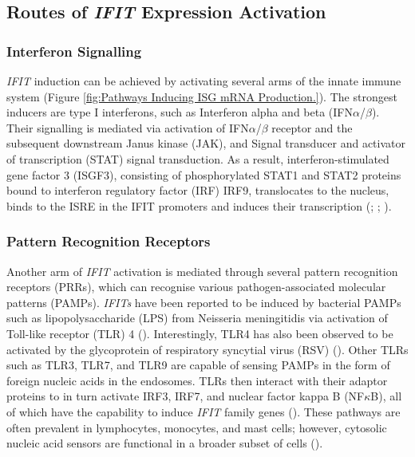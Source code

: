 \subsection{Routes of \textit{IFIT} Expression Activation} \label{subsec:Routes of IFIT Expression Activation}
\subsubsection{Interferon Signalling} \label{Interferon Signalling}
\textit{IFIT} induction can be achieved by activating several arms of the innate immune system (Figure \ref{fig:Pathways Inducing ISG mRNA Production.}). The strongest inducers are type I interferons, such as Interferon alpha and beta (IFN\(\alpha\)/\(\beta\)).  Their signalling is mediated via activation of IFN\(\alpha\)/\(\beta\) receptor and the subsequent downstream Janus kinase (JAK), and Signal transducer and activator of transcription (STAT) signal transduction. As a result, interferon-stimulated gene factor 3 (ISGF3), consisting of phosphorylated STAT1 and STAT2 proteins bound to interferon regulatory factor (IRF) IRF9, translocates to the nucleus, binds to the ISRE in the IFIT promoters and induces their transcription (\cite{Der1998IdentificationArrays}; \cite{Mesev2019DecodingInfection}; \cite{Schoggins2011Interferon-stimulatedFunctions}). 




\subsubsection{Pattern Recognition Receptors} \label{Pattern Recognition Receptors}
Another arm of \textit{IFIT} activation is mediated through several pattern recognition receptors (PRRs), which can recognise various pathogen-associated molecular patterns (PAMPs). \textit{IFITs} have been reported to be induced by bacterial PAMPs such as lipopolysaccharide (LPS) from Neisseria meningitidis via activation of Toll-like receptor (TLR) 4 (\cite{Zhou2013InterferonDefense.}). Interestingly, TLR4 has also been observed to be activated by the glycoprotein of respiratory syncytial virus (RSV) (\cite{Funchal2015RespiratoryNeutrophils}). Other TLRs such as TLR3, TLR7, and TLR9 are capable of sensing PAMPs in the form of foreign nucleic acids in the endosomes. TLRs then interact with their adaptor proteins to in turn activate IRF3, IRF7, and nuclear factor kappa B (NF\(\kappa\)B), all of which have the capability to induce \textit{IFIT} family genes (\cite{Diamond2013TheProteins}). These pathways are often prevalent in lymphocytes, monocytes, and mast cells; however, cytosolic nucleic acid sensors are functional in a broader subset of cells (\cite{Ablasser2011WhereFit}).

